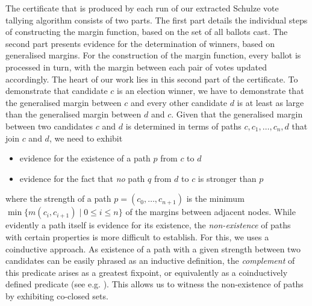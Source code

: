 The certificate that is produced by each run of our extracted Schulze vote
tallying algorithm  consists of two parts. The first part details
the individual steps of constructing the margin function, based on
the set of all ballots cast. The second part presents evidence for
the determination of winners, based on generalised margins. For the
construction of the margin function, every ballot is processed
in turn, with the margin between each pair of votes updated
accordingly.  The heart of our work lies in this second part of the
certificate. To demonstrate that candidate $c$ is an election
winner, we have to demonstrate that the generalised margin between
$c$ and every other candidate $d$ is at least as large than the
generalised margin  between $d$ and $c$. Given that the generalised margin
between two candidates $c$ and $d$ is determined in terms of
paths $c, c_1, \dots, c_n, d$ that join $c$
and $d$, we need to exhibit
\begin{itemize}
\item evidence for the existence of a path $p$ from $c$ to $d$
\item evidence for the fact that \emph{no} path $q$ from $d$ to $c$
is stronger than $p$
\end{itemize}
where the strength of a path $p = (c_0, \dots, c_{n+1})$ is the
minimum $\min \lbrace m(c_i, c_{i+1}) \mid 0 \leq i \leq n \rbrace$
of the margins between adjacent nodes.  While evidently a path
itself is evidence for its existence, the \emph{non-existence} of
paths with certain properties is more difficult to establish. For this,
we uses a coinductive approach. As existence of a path with a given
strength between two candidates can be easily phrased as an
inductive definition, the \emph{complement} of this predicate arises
as a greatest fixpoint, or equivalently as a coinductively defined
predicate (see e.g. \citep{Kozen:2016:PC}). This allows us to witness
the non-existence of paths by exhibiting co-closed sets.
  

